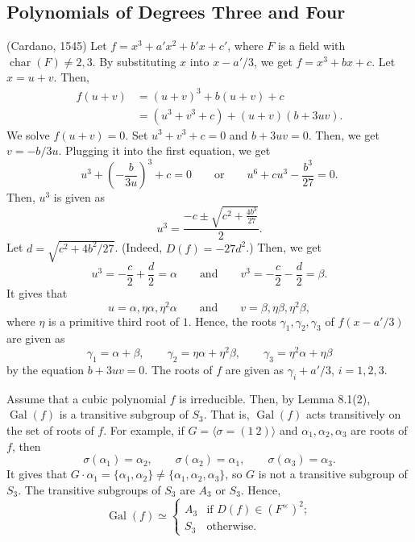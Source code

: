 \documentclass[twoside]{article}
\DeclareMathOperator\Char{char}
\DeclareMathOperator\Gal{Gal}
\theoremstyle{remark}
\begin{document}
\subsection{Polynomials of Degrees Three and Four}

(Cardano, 1545) Let \(f = x^3 + a'x^2 + b'x + c'\), where \(F\) is a field with \(\Char(F) \neq 2,3\). By substituting \(x\) into \(x-a'/3\), we get \(f = x^3 + bx + c\). Let \(x = u + v\). Then,
\begin{align*}
  f(u+v) & = (u+v)^3 + b(u+v) + c \\
  & = (u^3 + v^3 + c) + (u+v)(b + 3uv).
\end{align*}
We solve \(f(u+v)=0\). Set \(u^3 + v^3 + c = 0\) and \(b + 3uv = 0\). Then, we get \(v = -b/3u\). Plugging it into the first equation, we get
\[ u^3 + \left( - \frac{b}{3u} \right)^3 + c = 0 \qquad \text{or} \qquad u^6 + cu^3 - \frac{b^3}{27} = 0. \]
Then, \(u^3\) is given as
\[ u^3 = \frac{-c \pm \sqrt{c^2 + \frac{4b^3}{27}}}{2}. \]
Let \(d = \sqrt{c^2 + 4b^2/27}\). (Indeed, \(D(f) = -27d^2\).) Then, we get
\[ u^3 = - \frac c2 + \frac d2 = \alpha \qquad \text{and} \qquad v^3 = - \frac c2 - \frac d2 = \beta. \]
It gives that
\[ u = \alpha, \eta\alpha, \eta^2\alpha \qquad \text{and} \qquad v = \beta, \eta\beta, \eta^2\beta, \]
where \(\eta\) is a primitive third root of \(1\). Hence, the roots \(\gamma_1, \gamma_2, \gamma_3\) of \(f(x-a'/3)\) are given as
\[ \gamma_1 = \alpha+\beta, \qquad \gamma_2 = \eta\alpha + \eta^2\beta, \qquad \gamma_3 = \eta^2\alpha + \eta\beta \]
by the equation \(b+3uv = 0\). The roots of \(f\) are given as \(\gamma_i + a'/3\), \(i=1,2,3\).

Assume that a cubic polynomial \(f\) is irreducible. Then, by Lemma 8.1(2), \(\Gal(f)\) is a transitive subgroup of \(S_3\). That is, \(\Gal(f)\) acts transitively on the set of roots of \(f\). For example, if \(G = \langle \sigma = (1~2) \rangle\) and \(\alpha_1, \alpha_2, \alpha_3\) are roots of \(f\), then
\[ \sigma(\alpha_1) = \alpha_2, \qquad \sigma(\alpha_2) = \alpha_1, \qquad \sigma(\alpha_3) = \alpha_3. \]
It gives that \(G \cdot \alpha_1 = \{\alpha_1, \alpha_2\} \neq \{\alpha_1, \alpha_2, \alpha_3\}\), so \(G\) is not a transitive subgroup of \(S_3\). The transitive subgroups of \(S_3\) are \(A_3\) or \(S_3\). Hence,
\[ \Gal(f) \simeq \begin{cases} A_3 & \text{if } D(f) \in (F^\times)^2; \\ S_3 & \text{otherwise}. \end{cases} \]
\end{document}
